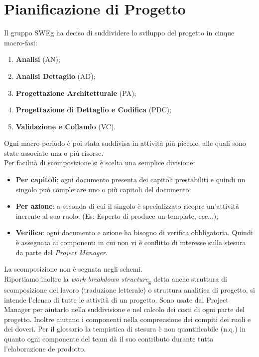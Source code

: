 \documentclass[12pt,a4paper,titlepage]{article}
\begin{document}
			
	\newpage	
	
	\section{Pianificazione di Progetto}
	Il gruppo SWEg ha deciso di suddividere lo sviluppo del progetto in cinque macro-fasi:
	\begin{enumerate}
		\item \textbf{Analisi} (AN);
		\item \textbf{Analisi Dettaglio} (AD);
		\item \textbf{Progettazione Architetturale} (PA);
		\item \textbf{Progettazione di Dettaglio e Codifica} (PDC);
		\item \textbf{Validazione e Collaudo} (VC).
	\end{enumerate}
	Ogni macro-periodo è poi stata suddivisa in attività più piccole, alle quali sono state associate una o più risorse. \\
	Per facilità di scomposizione si è scelta una semplice divisione:
	\begin{itemize}
		\item \textbf{Per capitoli}: ogni documento presenta dei capitoli prestabiliti e quindi un singolo può completare uno o più capitoli del documento;
		\item \textbf{Per azione}: a seconda di cui il singolo è specializzato ricopre un'attività inerente al suo ruolo. (Es: Esperto di produce un template, ecc...);
		\item \textbf{Verifica}: ogni documento e azione ha bisogno di verifica obbligatoria. Quindi è assegnata ai componenti in cui non vi è conflitto di interesse sulla stesura da parte del \textit{Project Manager}.
	\end{itemize} 
	La scomposizione non è segnata negli schemi.\\
	Riportiamo inoltre la \textit{work breakdown structure}\textsubscript{g} detta anche struttura di scomposizione del lavoro (traduzione letterale) o struttura analitica di progetto, si intende l'elenco di tutte le attività di un progetto. Sono usate dal Project Manager per aiutarlo nella suddivisione e nel calcolo dei costi di ogni parte del progetto. Inoltre aiutano i componenti nella comprensione dei compiti dei ruoli e dei doveri.
	Per il glossario la tempistica di stesura è non quantificabile (n.q.) in quanto ogni componente del team dà il suo contributo durante tutta l'elaborazione de prodotto.
	
\end{document}
